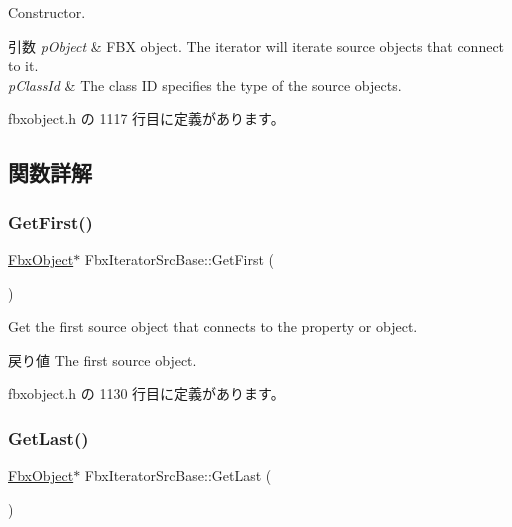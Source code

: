 Constructor. 
\begin{DoxyParams}{引数}
{\em p\+Object} & F\+BX object. The iterator will iterate source objects that connect to it. \\
\hline
{\em p\+Class\+Id} & The class ID specifies the type of the source objects. \\
\hline
\end{DoxyParams}


 fbxobject.\+h の 1117 行目に定義があります。



\subsection{関数詳解}
\mbox{\label{class_fbx_iterator_src_base_a19eea19f9f5fe3e94cc4a9fc626404c4}} 
\subsubsection{\texorpdfstring{Get\+First()}{GetFirst()}}
{\footnotesize\ttfamily \hyperlink{class_fbx_object}{Fbx\+Object}$\ast$ Fbx\+Iterator\+Src\+Base\+::\+Get\+First (\begin{DoxyParamCaption}{ }\end{DoxyParamCaption})\hspace{0.3cm}{\ttfamily [inline]}}

Get the first source object that connects to the property or object. \begin{DoxyReturn}{戻り値}
The first source object. 
\end{DoxyReturn}


 fbxobject.\+h の 1130 行目に定義があります。

\mbox{\label{class_fbx_iterator_src_base_a84d527f63d0b2953318bfcaac25b9b4a}} 
\subsubsection{\texorpdfstring{Get\+Last()}{GetLast()}}
{\footnotesize\ttfamily \hyperlink{class_fbx_object}{Fbx\+Object}$\ast$ Fbx\+Iterator\+Src\+Base\+::\+Get\+Last (\begin{DoxyParamCaption}{ }\end{DoxyParamCaption})\hspace{0.3cm}{\ttfamily [inline]}}

